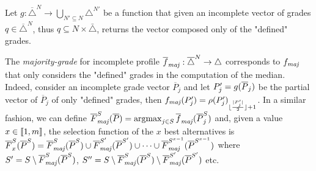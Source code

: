 
Let $g:\overline{\triangle}^N\rightarrow \bigcup_{N' \subseteq N}\triangle^{N'}$ be a  function that given an incomplete vector of grades $q \in \overline{\triangle}^N$, thus $q \subseteq N × \bar{\triangle}$, returns the vector composed only of the "defined" grades. 


The \emph{majority-grade} for incomplete profile $\fmajbar: \overline{\triangle}^N \rightarrow \triangle$ corresponds to $\fmaj$ that only considers the "defined" grades in the computation of the median. Indeed, consider an incomplete grade vector $\overline{P}_j$ and let $P'_j=g(\overline{P}_j)$ be the partial vector of $\overline{P}_j$ of only "defined" grades, then $\fmaj(P'_j) = \rho(P'_j)_{\floor{\frac{\card{P'_j}}{2}} + 1}$.
In a similar fashion, we can define $\Fmajbar[S](\Pbar)=\argmax_{j\in S}\fmajbar(\Pbar^S_j)$ and, given a value $x\in \llbracket1,m\rrbracket$, the selection function of the $x$ best alternatives is $\overline{F}^S_x(\Pbar^S) = \Fmajbar[S](\Pbar^S) \cup \Fmajbar[S'](\Pbar^{S'}) \cup \dots \cup \Fmajbar[S^{x-1}](\Pbar^{S^{x-1}})$ where $S'= S \setminus \Fmajbar[S](\Pbar^{S})$, $S''= S \setminus \Fmajbar[S](\Pbar^S) \setminus \Fmajbar[S'](\Pbar^{S'})$ etc.

